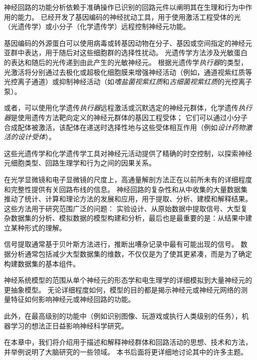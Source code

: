 \begin{proposition}[神经元活动的光遗传学和化学遗传学操作] \label{box:5_2}
	
	\quad \quad 神经回路的功能分析依赖于准确操作已识别的回路元件以阐明其在生理和行为中作用的能力。
	已经开发了基因编码的神经扰动工具，用于使用激活工程受体的光（光遗传学）或小分子（化学遗传学）远程控制神经元功能。
	
	\quad \quad 基因编码的外源蛋白可以使用病毒或转基因动物在分子、基因或空间指定的神经元亚群中表达，用于随后对这些细胞群的选择性扰动。
	光遗传学方法涉及光敏蛋白的表达和随后的光传递到由此产生的光敏神经元。
	根据光遗传学\textit{执行器}的类型，光激活将分别通过去极化或超极化细胞膜来增强神经活动（例如，通道视紫红质等光控离子通道）或抑制神经活动（如\textit{嗜盐菌视紫红质}和\textit{古细菌视紫红质}的光控离子泵）。
	
	\quad \quad 或者，可以使用化学遗传\textit{执行器}远程激活或沉默选定的神经元群体，化学遗传\textit{执行器}是使用遗传方法靶向定义的神经元群体的基因工程受体；
	它们可以通过小分子合成配体被激活，该配体在递送时选择性地与这些受体相互作用（例如\textit{设计药物激活的设计受体}）。
	
	\quad \quad 这些光遗传学和化学遗传学工具对神经元活动提供了精确的时空控制，以探索神经元细胞类型、回路生理学和行为之间的因果关系。
	
\end{proposition}


在光学显微镜和电子显微镜的尺度上，高通量解剖方法正在以前所未有的详细程度和完整性提供有关回路布线的信息。
神经回路的复杂性和从中收集的大量数据集推动了统计、计算和理论方法的发展和应用，用于提取、分析、建模和解释结果。
这些方法用于研究范围广泛的问题：
实验设计、从原始数据中提取信号、大型复杂数据集的分析、模拟数据的模型构建和分析，最后也是最重要的是：从结果中建立某种形式的理解。


信号提取通常基于贝叶斯方法进行，推断出嘈杂记录中最有可能出现的信号。
数据分析通常包括减少大型数据集的维数，不仅仅是为了使其更紧凑，而是为了确定构建数据集的基本组件。


神经系统模型的范围从单个神经元的形态学和电生理学的详细模拟到大量神经元的更抽象模型。
无论详细程度如何，模型的目的都是揭示神经元或神经元网络的测量特征如何影响神经元或神经回路的功能。


此外，在最高级别的功能中（例如识别图像、玩游戏或执行人类级别的任务），机器学习的想法正日益影响神经科学研究。


在本章中，我们将介绍用于描述和解释神经群体和回路活动的思想、技术和方法，并举例说明了大脑研究的一些领域。
本书后面将更详细地讨论其中的许多主题。




